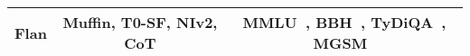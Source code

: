 \begin{table*}[!tbhp]
\begin{tabular}{l|c|c}
Flan & Muffin, T0-SF, NIv2, CoT & MMLU~\cite{hendrycks2020measuring}, BBH~\cite{srivastava2022beyond}, TyDiQA~\cite{clark2020tydi}, MGSM~\cite{shi2022language}  \\ \hline




\end{tabular}
\end{table*}


